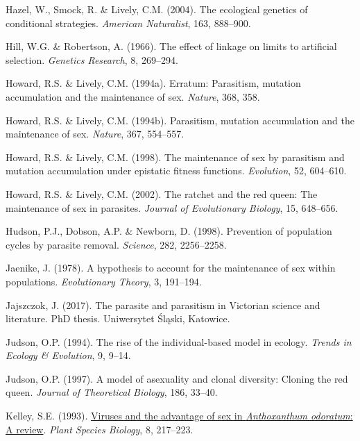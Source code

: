 \documentclass[
  letterpaper,
]{book}
\newlength{\cslhangindent}
\newenvironment{CSLReferences}[2] %
 {\begin{list}{}{%
  \setlength{\itemindent}{0pt}
  \setlength{\leftmargin}{0pt}
  \setlength{\parsep}{0pt}
  \ifodd #1
   \setlength{\leftmargin}{\cslhangindent}
   \setlength{\itemindent}{-1\cslhangindent}
  \fi
  \setlength{\itemsep}{#2\baselineskip}}}
 {\end{list}}
\begin{document}
\begin{CSLReferences}{1}{0}
Hazel, W., Smock, R. \& Lively, C.M. (2004). The ecological genetics of
conditional strategies. \emph{American Naturalist}, 163, 888--900.

Hill, W.G. \& Robertson, A. (1966). The effect of linkage on limits to
artificial selection. \emph{Genetics Research}, 8, 269--294.

Howard, R.S. \& Lively, C.M. (1994a). Erratum: Parasitism, mutation
accumulation and the maintenance of sex. \emph{Nature}, 368, 358.

Howard, R.S. \& Lively, C.M. (1994b). Parasitism, mutation accumulation
and the maintenance of sex. \emph{Nature}, 367, 554--557.

Howard, R.S. \& Lively, C.M. (1998). The maintenance of sex by
parasitism and mutation accumulation under epistatic fitness functions.
\emph{Evolution}, 52, 604--610.

Howard, R.S. \& Lively, C.M. (2002). The ratchet and the red queen: The
maintenance of sex in parasites. \emph{Journal of Evolutionary Biology},
15, 648--656.

Hudson, P.J., Dobson, A.P. \& Newborn, D. (1998). Prevention of
population cycles by parasite removal. \emph{Science}, 282, 2256--2258.

Jaenike, J. (1978). A hypothesis to account for the maintenance of sex
within populations. \emph{Evolutionary Theory}, 3, 191--194.

Jajszczok, J. (2017). The parasite and parasitism in {Victorian} science
and literature. PhD thesis. Uniwersytet Śląski, Katowice.

Judson, O.P. (1994). The rise of the individual-based model in ecology.
\emph{Trends in Ecology \& Evolution}, 9, 9--14.

Judson, O.P. (1997). A model of asexuality and clonal diversity: Cloning
the red queen. \emph{Journal of Theoretical Biology}, 186, 33--40.

Kelley, S.E. (1993).
\href{https://doi.org/10.1111/j.1442-1984.1993.tb00072.x}{Viruses and
the advantage of sex in \emph{{A}nthoxanthum odoratum}: A review}.
\emph{Plant Species Biology}, 8, 217--223.


\end{CSLReferences}
\end{document}
